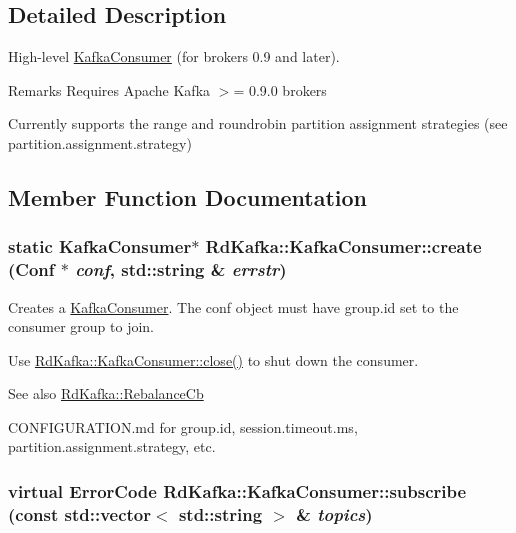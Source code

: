 \subsection{Detailed Description}
High-\/level \hyperlink{classRdKafka_1_1KafkaConsumer}{KafkaConsumer} (for brokers 0.9 and later). \begin{DoxyRemark}{Remarks}
Requires Apache Kafka $>$= 0.9.0 brokers
\end{DoxyRemark}
Currently supports the {\ttfamily range} and {\ttfamily roundrobin} partition assignment strategies (see {\ttfamily partition.assignment.strategy}) 

\subsection{Member Function Documentation}
\hypertarget{classRdKafka_1_1KafkaConsumer_ac32a5eb3474b3315635cb1d39794d068}{
\subsubsection[{create}]{\setlength{\rightskip}{0pt plus 5cm}static {\bf KafkaConsumer}$\ast$ RdKafka::KafkaConsumer::create ({\bf Conf} $\ast$ {\em conf}, \/  std::string \& {\em errstr})}}
\label{classRdKafka_1_1KafkaConsumer_ac32a5eb3474b3315635cb1d39794d068}


Creates a \hyperlink{classRdKafka_1_1KafkaConsumer}{KafkaConsumer}. The {\ttfamily conf} object must have {\ttfamily group.id} set to the consumer group to join.

Use \hyperlink{classRdKafka_1_1KafkaConsumer_a5c78a721aa91f3be9903f09ddf084644}{RdKafka::KafkaConsumer::close()} to shut down the consumer.

\begin{DoxySeeAlso}{See also}
\hyperlink{classRdKafka_1_1RebalanceCb}{RdKafka::RebalanceCb} 

CONFIGURATION.md for {\ttfamily group.id}, {\ttfamily session.timeout.ms}, {\ttfamily partition.assignment.strategy}, etc. 
\end{DoxySeeAlso}
\hypertarget{classRdKafka_1_1KafkaConsumer_a7404297cecc9be656026c6c6154ce2bd}{
\subsubsection[{subscribe}]{\setlength{\rightskip}{0pt plus 5cm}virtual ErrorCode RdKafka::KafkaConsumer::subscribe (const std::vector$<$ std::string $>$ \& {\em topics})}}
\label{classRdKafka_1_1KafkaConsumer_a7404297cecc9be656026c6c6154ce2bd}


